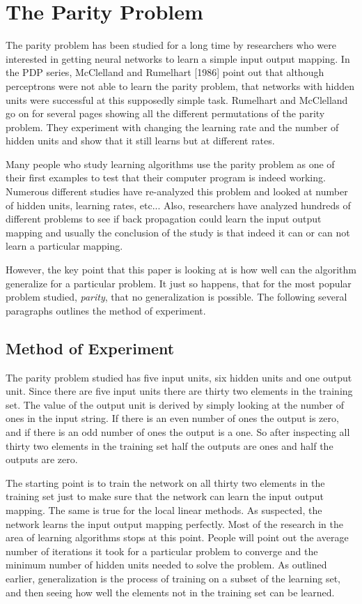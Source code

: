 \section{The Parity Problem}

	The parity problem has been studied for a long time by
researchers who were interested in getting neural networks to learn a
simple input output mapping.  In the PDP series, McClelland and
Rumelhart [1986] point out that although perceptrons were not able to
learn the parity problem, that networks with hidden units were
successful at this supposedly simple task.  Rumelhart and McClelland
go on for several pages showing all the different permutations of the
parity problem.  They experiment with changing the learning rate and
the number of hidden units and show that it still learns but at
different rates.

	Many people who study learning algorithms use the parity
problem as one of their first examples to test that their computer
program is indeed working.  Numerous different studies have
re-analyzed this problem and looked at number of hidden units,
learning rates, etc...  Also, researchers have analyzed hundreds of
different problems to see if back propagation could learn the input
output mapping and usually the conclusion of the study is that indeed
it can or can not learn a particular mapping.

	However, the key point that this paper is looking at is how
well can the algorithm generalize for a particular problem.  It just
so happens, that for the most popular problem studied, {\it parity},
that no generalization is possible.  The following several paragraphs
outlines the method of experiment.

\subsection{Method of Experiment}

	The parity problem studied has five input units, six hidden
units and one output unit.  Since there are five input units there are
thirty two elements in the training set.  The value of the output unit
is derived by simply looking at the number of ones in the input
string.  If there is an even number of ones the output is zero, and if
there is an odd number of ones the output is a one.  So after
inspecting all thirty two elements in the training set half the
outputs are ones and half the outputs are zero.

	The starting point is to train the network on all thirty two
elements in the training set just to make sure that the network can
learn the input output mapping.  The same is true for the local linear
methods.  As suspected, the network learns the input output mapping
perfectly.  Most of the research in the area of learning algorithms
stops at this point.  People will point out the average number of
iterations it took for a particular problem to converge and the
minimum number of hidden units needed to solve the problem.  As
outlined earlier, generalization is the process of training on a
subset of the learning set, and then seeing how well the elements not
in the training set can be learned.


